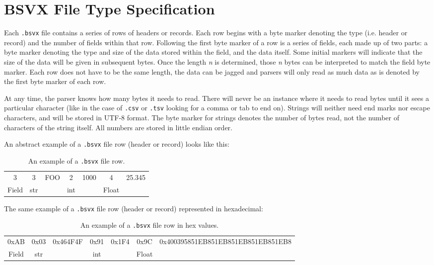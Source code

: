 \documentclass[10pt]{article}
\begin{document}
\section*{BSVX File Type Specification}

Each \texttt{.bsvx} file contains a series of rows of headers or records.
Each row begins with a byte marker denoting the type (i.e. header or record) and the number of fields within that row.
Following the first byte marker of a row is a series of fields, each made up of two parts: a byte marker denoting the type and size of the data stored within the field, and the data itself.
Some initial markers will indicate that the size of the data will be given in subsequent bytes.
Once the length \textit{n} is determined, those \textit{n} bytes can be interpreted to match the field byte marker.
Each row does not have to be the same length, the data can be jagged and parsers will only read as much data as is denoted by the first byte marker of each row. 

\indent{}
At any time, the parser knows how many bytes it needs to read.
There will never be an instance where it needs to read bytes until it sees a particular character (like in the case of \texttt{.csv} or \texttt{.tsv} looking for a comma or tab to end on).
Strings will neither need end marks nor escape characters, and will be stored in UTF-8 format.
The byte marker for strings denotes the number of bytes read, not the number of characters of the string itself.
All numbers are stored in little endian order.

\indent{}
An abstract example of a \texttt{.bsvx} file row (header or record) looks like this:

\begin{table}[H]
\centering
\begin{tabular}{|c|c|c|c|c|c|c|}
\hline
3 & 3 & FOO & 2 & 1000 & 4 & 25.345 \\
Field & str &  & int &  & Float &  \\ \hline
\end{tabular}
\caption{An example of a \texttt{.bsvx} file row.}
\label{tab:bsvxApproach_example}
\end{table}

\indent{}
The same example of a \texttt{.bsvx} file row (header or record) represented in hexadecimal:

\begin{table}[H]
\centering
\begin{tabular}{|c|c|c|c|c|c|c|}
\hline
0xAB & 0x03 & 0x464F4F & 0x91 & 0x1F4 & 0x9C & 0x400395851EB851EB851EB851EB851EB8 \\
Field & str &  & int &  & Float &  \\ \hline
\end{tabular}
\caption{An example of a \texttt{.bsvx} file row in hex values.}
\label{tab:bsvxApproach_example in hexadecimal}
\end{table}
\end{document}
